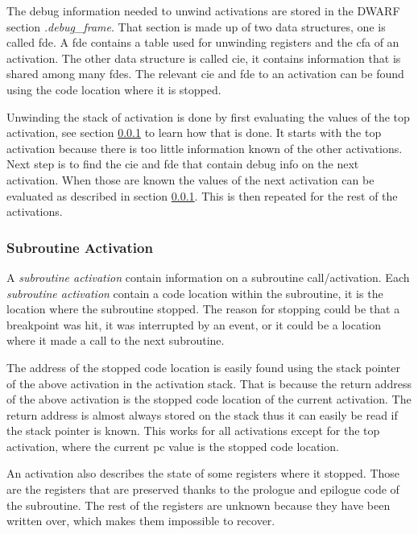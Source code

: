 The debug information needed to unwind activations are stored in the \gls{DWARF} section \emph{.debug\_frame}.
That section is made up of two data structures, one is called \gls{fde}.
A \gls{fde} contains a table used for unwinding registers and the \gls{cfa} of an activation.
The other data structure is called \gls{cie}, it contains information that is shared among many \glspl{fde}.
The relevant \gls{cie} and \gls{fde} to an activation can be found using the code location where it is stopped.


Unwinding the stack of activation is done by first evaluating the values of the top activation, see section \ref{sec:subact} to learn how that is done.
It starts with the top activation because there is too little information known of the other activations.
Next step is to find the \gls{cie} and \gls{fde} that contain debug info on the next activation.
When those are known the values of the next activation can be evaluated as described in section \ref{sec:subact}.
This is then repeated for the rest of the activations.


\subsubsection{Subroutine Activation} \label{sec:subact}
A \emph{subroutine activation} contain information on a subroutine call/activation.
Each \emph{subroutine activation} contain a code location within the subroutine, it is the location where the subroutine stopped.
The reason for stopping could be that a breakpoint was hit, it was interrupted by an event, or it could be a location where it made a call to the next subroutine.


The address of the stopped code location is easily found using the stack pointer of the above activation in the activation stack.
That is because the return address of the above activation is the stopped code location of the current activation.
The return address is almost always stored on the stack thus it can easily be read if the stack pointer is known.
This works for all activations except for the top activation, where the current \gls{pc} value is the stopped code location.


An activation also describes the state of some registers where it stopped.
Those are the registers that are preserved thanks to the prologue and epilogue code of the subroutine.
The rest of the registers are unknown because they have been written over, which makes them impossible to recover.


